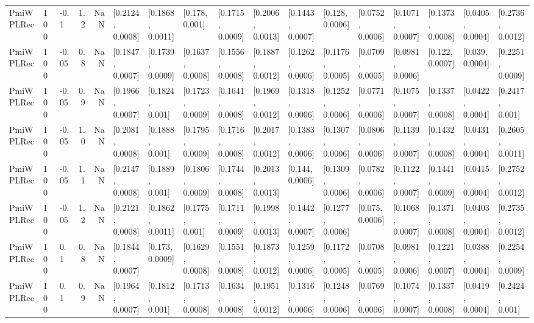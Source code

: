 \begin{tabular}{lllrrllllllllllll}
 PmiWPLRec &  100 &  -0.1 &   1.2 &   NaN &  [0.2124, 0.0008] &  [0.1868, 0.0011] &    [0.178, 0.001] &  [0.1715, 0.0009] &  [0.2006, 0.0013] &  [0.1443, 0.0007] &   [0.128, 0.0006] &  [0.0752, 0.0006] &  [0.1071, 0.0007] &  [0.1373, 0.0008] &  [0.0405, 0.0004] &  [0.2736, 0.0012] \\
 PmiWPLRec &  100 & -0.05 &   0.8 &   NaN &  [0.1847, 0.0007] &  [0.1739, 0.0009] &  [0.1637, 0.0008] &  [0.1556, 0.0008] &  [0.1887, 0.0012] &  [0.1262, 0.0006] &  [0.1176, 0.0005] &  [0.0709, 0.0005] &  [0.0981, 0.0006] &   [0.122, 0.0007] &   [0.039, 0.0004] &  [0.2251, 0.0009] \\
 PmiWPLRec &  100 & -0.05 &   0.9 &   NaN &  [0.1966, 0.0007] &   [0.1824, 0.001] &  [0.1723, 0.0009] &  [0.1641, 0.0008] &  [0.1969, 0.0012] &  [0.1318, 0.0006] &  [0.1252, 0.0006] &  [0.0771, 0.0006] &  [0.1075, 0.0007] &  [0.1337, 0.0008] &  [0.0422, 0.0004] &   [0.2417, 0.001] \\
 PmiWPLRec &  100 & -0.05 &   1.0 &   NaN &  [0.2081, 0.0008] &   [0.1888, 0.001] &  [0.1795, 0.0009] &  [0.1716, 0.0008] &  [0.2017, 0.0012] &  [0.1383, 0.0006] &  [0.1307, 0.0006] &  [0.0806, 0.0006] &  [0.1139, 0.0007] &  [0.1432, 0.0008] &  [0.0431, 0.0004] &  [0.2605, 0.0011] \\
 PmiWPLRec &  100 & -0.05 &   1.1 &   NaN &  [0.2147, 0.0008] &   [0.1889, 0.001] &  [0.1806, 0.0009] &  [0.1744, 0.0008] &  [0.2013, 0.0013] &   [0.144, 0.0006] &  [0.1309, 0.0006] &  [0.0782, 0.0006] &  [0.1122, 0.0007] &  [0.1441, 0.0009] &  [0.0415, 0.0004] &  [0.2752, 0.0012] \\
 PmiWPLRec &  100 & -0.05 &   1.2 &   NaN &  [0.2121, 0.0008] &  [0.1862, 0.0011] &   [0.1775, 0.001] &  [0.1711, 0.0009] &  [0.1998, 0.0013] &  [0.1442, 0.0007] &  [0.1277, 0.0006] &   [0.075, 0.0006] &  [0.1068, 0.0007] &  [0.1371, 0.0008] &  [0.0403, 0.0004] &  [0.2735, 0.0012] \\
 PmiWPLRec &  100 &   0.1 &   0.8 &   NaN &  [0.1844, 0.0007] &   [0.173, 0.0009] &  [0.1629, 0.0008] &  [0.1551, 0.0008] &  [0.1873, 0.0012] &  [0.1259, 0.0006] &  [0.1172, 0.0005] &  [0.0708, 0.0005] &  [0.0981, 0.0006] &  [0.1221, 0.0007] &  [0.0388, 0.0004] &  [0.2254, 0.0009] \\
 PmiWPLRec &  100 &   0.1 &   0.9 &   NaN &  [0.1964, 0.0007] &   [0.1812, 0.001] &  [0.1713, 0.0008] &  [0.1634, 0.0008] &  [0.1951, 0.0012] &  [0.1316, 0.0006] &  [0.1248, 0.0006] &  [0.0769, 0.0006] &  [0.1074, 0.0007] &  [0.1337, 0.0008] &  [0.0419, 0.0004] &   [0.2424, 0.001] \\

\end{tabular}

